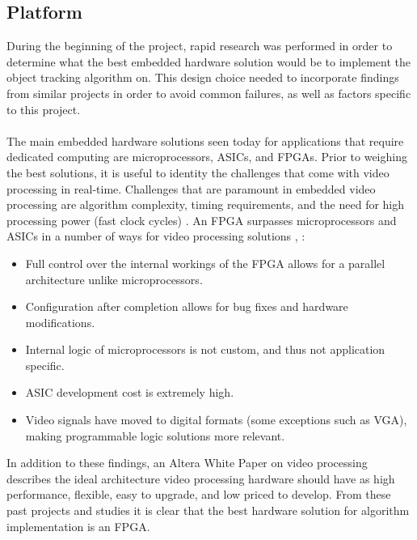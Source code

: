 \documentclass[11pt]{article} %
\begin{document}
\subsection{Platform}
\label{sec:platform}
During the beginning of the project, rapid research was performed in order to determine what the best embedded hardware solution would be to implement the object tracking algorithm on. This design choice needed to incorporate findings from similar projects in order to avoid common failures, as well as factors specific to this project. \\\\
The main embedded hardware solutions seen today for applications that require dedicated computing are microprocessors, ASICs, and FPGAs. Prior to weighing the best solutions, it is useful to identity the challenges that come with video processing in real-time. Challenges that are paramount in embedded video processing are algorithm complexity, timing requirements, and the need for high processing power (fast clock cycles) \cite{2}.  An FPGA surpasses microprocessors and ASICs in a number of ways for video processing  solutions \cite{1}, \cite{2}:
\begin{itemize}
\item Full control over the internal workings of the FPGA allows for a parallel architecture unlike microprocessors.
\item Configuration after completion allows for bug fixes and hardware modifications.
\item Internal logic of microprocessors is not custom, and thus not application specific.
\item ASIC development cost is extremely high.
\item Video signals have moved to digital formats (some exceptions such as VGA), making programmable logic solutions more relevant.
\end{itemize}
In addition to these findings, an Altera White Paper \cite{3} on video processing describes the ideal architecture video processing hardware should have as high performance, flexible, easy to upgrade, and low priced to develop. From these past projects and studies it is clear that the best hardware solution for algorithm implementation is an FPGA. \\\\
\end{document}
